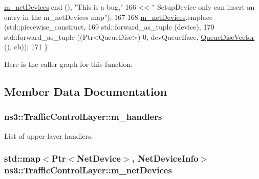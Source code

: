 \begin{DoxyCode}
      \hyperlink{classns3_1_1TrafficControlLayer_a78320d2a2610f730984ca796ed51a495}{m\_netDevices}.end (), \textcolor{stringliteral}{"This is a bug,"}
166                  << \textcolor{stringliteral}{"  SetupDevice only can insert an entry in the m\_netDevices map"});
167 
168   \hyperlink{classns3_1_1TrafficControlLayer_a78320d2a2610f730984ca796ed51a495}{m\_netDevices}.emplace (std::piecewise\_construct,
169                         std::forward\_as\_tuple (device),
170                         std::forward\_as\_tuple ((Ptr<QueueDisc>) 0, devQueueIface, 
      \hyperlink{classns3_1_1TrafficControlLayer_a9c468db4727d64733d7dba66d2791edf}{QueueDiscVector} (), cb));
171 \}
\end{DoxyCode}


Here is the caller graph for this function\+:




\subsection{Member Data Documentation}
\subsubsection[{\texorpdfstring{m\+\_\+handlers}{m_handlers}}]{ ns3\+::\+Traffic\+Control\+Layer\+::m\+\_\+handlers\hspace{0.3cm}{\ttfamily [private]}}\hypertarget{classns3_1_1TrafficControlLayer_a598f6f4d4efa5e776abfe6c0c3af65fa}{}\label{classns3_1_1TrafficControlLayer_a598f6f4d4efa5e776abfe6c0c3af65fa}


List of upper-\/layer handlers. 

\subsubsection[{\texorpdfstring{m\+\_\+net\+Devices}{m_netDevices}}]{\setlength{\rightskip}{0pt plus 5cm}std\+::map$<${\bf Ptr}$<${\bf Net\+Device}$>$, {\bf Net\+Device\+Info}$>$ ns3\+::\+Traffic\+Control\+Layer\+::m\+\_\+net\+Devices\hspace{0.3cm}{\ttfamily [private]}}\hypertarget{classns3_1_1TrafficControlLayer_a78320d2a2610f730984ca796ed51a495}{}\label{classns3_1_1TrafficControlLayer_a78320d2a2610f730984ca796ed51a495}


